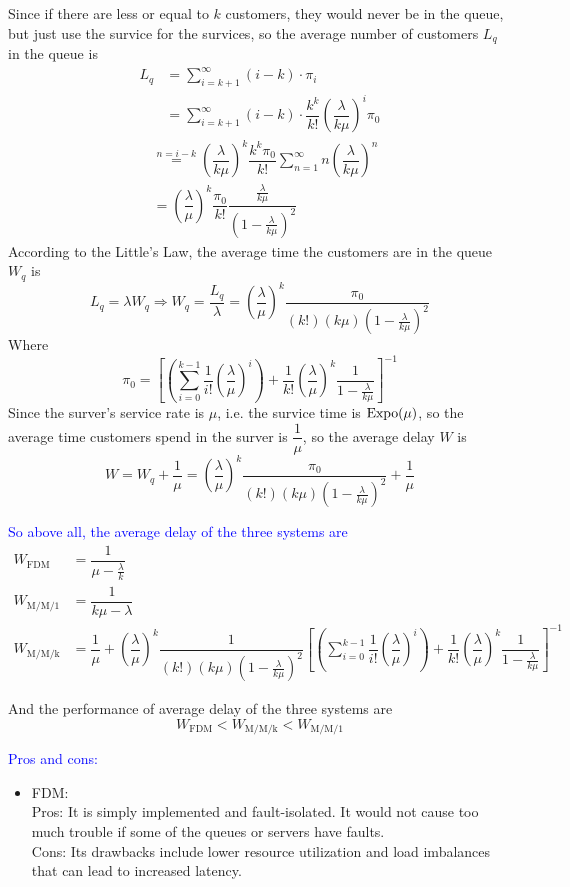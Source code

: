 \begin{homeworkProblem}
Since if there are less or equal to $k$ customers, they would never be in the queue, but just use the survice for the survices, so the average number of customers $L_q$ in the queue is
\begin{align*}
L_q &= \sum_{i=k+1}^{\infty}(i-k)\cdot\pi_i \\
&= \sum_{i=k+1}^{\infty}(i-k)\cdot\dfrac{k^k}{k!}\left(\dfrac{\lambda}{k\mu}\right)^i\pi_0
\end{align*}
\begin{align*}
&\stackrel{n=i-k}{=} \left(\dfrac{\lambda}{k\mu}\right)^k\dfrac{k^k\pi_0}{k!}\sum_{n=1}^{\infty}n\left(\dfrac{\lambda}{k\mu}\right)^n \\
&= \left(\dfrac{\lambda}{\mu}\right)^k\dfrac{\pi_0}{k!}\dfrac{\frac{\lambda}{k\mu}}{(1-\frac{\lambda}{k\mu})^2}
\end{align*}
According to the Little's Law, the average time the customers are in the queue $W_q$ is
$$L_q=\lambda W_q\Rightarrow W_q=\dfrac{L_q}{\lambda} = \left(\dfrac{\lambda}{\mu}\right)^k\dfrac{\pi_0}{(k!)(k\mu)(1-\frac{\lambda}{k\mu})^2}$$
Where
$$\pi_0 = \left[\left(\sum_{i=0}^{k-1}\dfrac{1}{i!}\left(\dfrac{\lambda}{\mu}\right)^i\right)+\dfrac{1}{k!}\left(\dfrac{\lambda}{\mu}\right)^k\dfrac{1}{1-\frac{\lambda}{k\mu}}\right]^{-1}$$
Since the surver's service rate is $\mu$, i.e. the survice time is $\operatorname{Expo}(\mu)$, so the average time customers spend in the surver is $\dfrac{1}{\mu}$, so the average delay $W$ is
$$W=W_q+\dfrac{1}{\mu}= \left(\dfrac{\lambda}{\mu}\right)^k\dfrac{\pi_0}{(k!)(k\mu)(1-\frac{\lambda}{k\mu})^2}+\dfrac{1}{\mu}$$

\textcolor{blue}{So above all, the average delay of the three systems are}
\begin{align*}
W_{\text{FDM}} &= \dfrac{1}{\mu-\frac{\lambda}{k}} \\
W_{\text{M/M/1}} &= \dfrac{1}{k\mu-\lambda} \\
W_{\text{M/M/k}} &= \dfrac{1}{\mu} + \left(\dfrac{\lambda}{\mu}\right)^k\dfrac{1}{(k!)(k\mu)(1-\frac{\lambda}{k\mu})^2}\left[\left(\sum_{i=0}^{k-1}\dfrac{1}{i!}\left(\dfrac{\lambda}{\mu}\right)^i\right)+\dfrac{1}{k!}\left(\dfrac{\lambda}{\mu}\right)^k\dfrac{1}{1-\frac{\lambda}{k\mu}}\right]^{-1}
\end{align*}

And the performance of average delay of the three systems are
$$W_{\text{FDM}} < W_{\text{M/M/k}} < W_{\text{M/M/1}}$$


\textcolor{blue}{Pros and cons:}
\begin{itemize}
\item FDM: \\
Pros: It is simply implemented and fault-isolated. It would not cause too much trouble if some of the queues or servers have faults. \\
Cons: Its drawbacks include lower resource utilization and load imbalances that can lead to increased latency.


\end{itemize}
\end{homeworkProblem}
